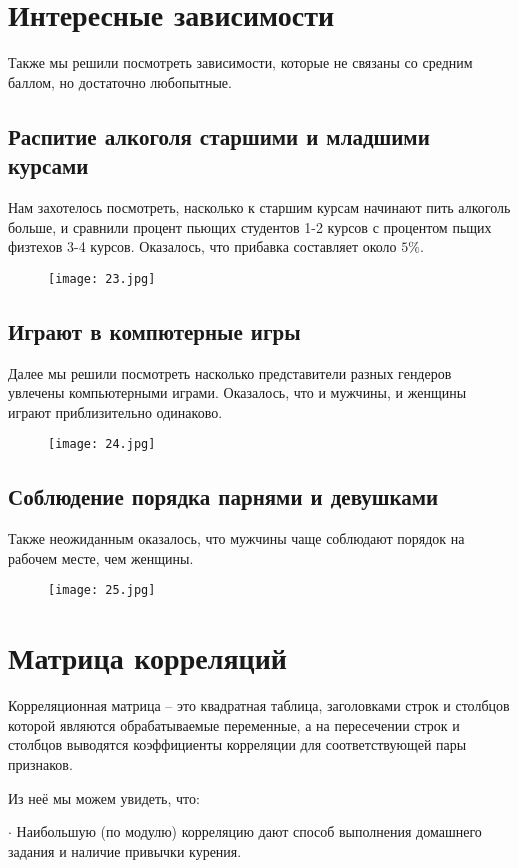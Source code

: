 \documentclass[a4paper,12pt]{article}
\begin{document}
\section{Интересные зависимости}
Также мы решили посмотреть зависимости, которые не связаны со средним баллом, но достаточно любопытные.
\subsection{Распитие алкоголя старшими и младшими курсами}
Нам захотелось посмотреть, насколько к старшим курсам начинают пить алкоголь больше, и сравнили процент пьющих студентов 1-2 курсов с процентом пьщих физтехов 3-4 курсов. Оказалось, что прибавка составляет около $5\%$.
\begin{figure}[h!]\centering
    \texttt{[image: 23.jpg]}
    \label{1_1}
\end{figure}
\newpage
\subsection{Играют в компютерные игры}
Далее мы решили посмотреть насколько представители разных гендеров увлечены компьютерными играми. Оказалось, что и мужчины, и женщины играют приблизительно одинаково.
\begin{figure}[h!]\centering
    \texttt{[image: 24.jpg]}
    \label{1_1}
\end{figure}

\subsection{Соблюдение порядка парнями и девушками}
Также неожиданным оказалось, что мужчины чаще соблюдают порядок на рабочем месте, чем женщины.
\begin{figure}[h!]\centering
    \texttt{[image: 25.jpg]}
    \label{1_1}
\end{figure}

\section{Матрица корреляций}
Корреляционная матрица – это квадратная таблица, заголовками строк и столбцов которой являются обрабатываемые переменные, а на пересечении строк и столбцов выводятся коэффициенты корреляции для соответствующей пары признаков.

Из неё мы можем увидеть, что:

$\cdot$ Наибольшую (по модулю) корреляцию дают способ выполнения домашнего задания и наличие привычки курения.
\end{document}

